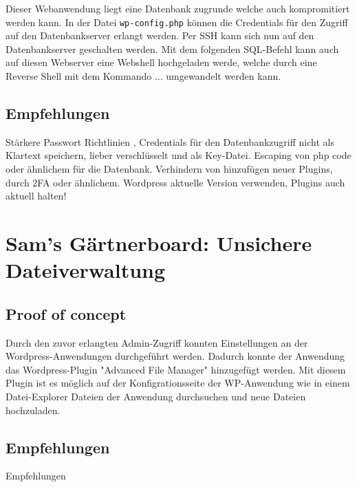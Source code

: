 Dieser Webanwendung liegt eine Datenbank zugrunde welche auch kompromitiert werden kann. In der Datei \texttt{wp-config.php} können die Credentials für den Zugriff auf den Datenbankserver erlangt werden. Per SSH kann sich nun auf den Datenbankserver geschalten werden. Mit dem folgenden SQL-Befehl kann auch auf diesen Webserver eine Webshell hochgeladen werde, welche durch eine Reverse Shell mit dem Kommando ... umgewandelt werden kann.

\subsection*{Empfehlungen} Stärkere Passwort Richtlinien \cite{bsi_passwords}, Credentials für den Datenbankzugriff nicht als Klartext speichern, lieber verschlüsselt und als Key-Datei. Escaping von php code oder ähnlichem für die Datenbank. Verhindern von hinzufügen neuer Plugins, durch 2FA oder ähnlichem. Wordpress aktuelle Version verwenden, Plugins auch aktuell halten!


\section{\makecvssbadge Sam's Gärtnerboard: Unsichere Dateiverwaltung}

\subsection*{Proof of concept}
Durch den zuvor erlangten Admin-Zugriff konnten Einstellungen an der Wordpress-Anwendungen durchgeführt werden. Dadurch konnte der Anwendung das Wordpress-Plugin "Advanced File Manager" hinzugefügt werden. Mit diesem Plugin ist es möglich auf der Konfigrationsseite der WP-Anwendung wie in einem Datei-Explorer Dateien der Anwendung durchsuchen und neue Dateien hochzuladen. 

\subsection*{Empfehlungen}
Empfehlungen



